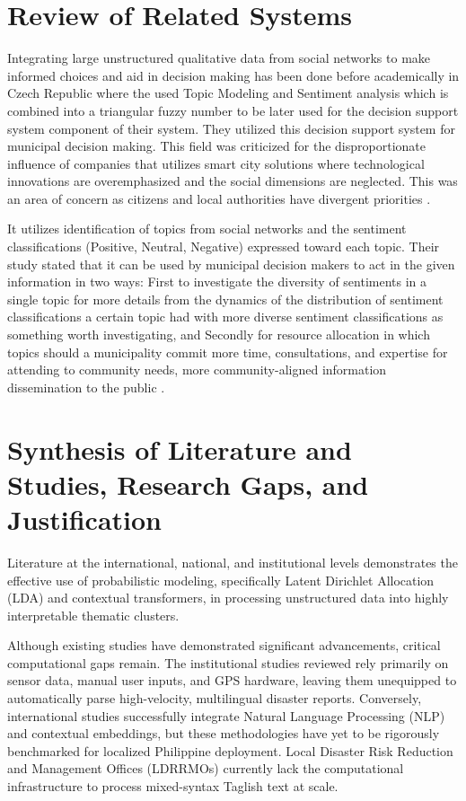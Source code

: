 \section*{Review of Related Systems}
Integrating large unstructured qualitative data from social networks to make informed choices and aid in decision making has been done before academically in Czech Republic where the used Topic Modeling and Sentiment analysis which is combined into a triangular fuzzy number to be later used for the decision support system component of their system. They utilized this decision support system for municipal decision making. This field was criticized for the disproportionate influence of companies that utilizes smart city solutions where technological innovations are overemphasized and the social dimensions are neglected. This was an area of concern as citizens and local authorities have divergent priorities \parencite{svana2026improving}.

It utilizes identification of topics from social networks and the sentiment classifications (Positive, Neutral, Negative) expressed toward each topic. Their
study stated that it can be used by municipal decision makers to act in the given information in two ways: First to investigate the diversity of sentiments in a single topic for more details from the dynamics of the distribution of sentiment classifications a certain topic had with more diverse sentiment classifications as something worth investigating, and Secondly for resource allocation in which topics should a municipality commit more time, consultations, and expertise for attending to community needs, more community-aligned information dissemination to the public \parencite{svana2026improving}.



\section*{Synthesis of Literature and Studies, Research Gaps, and Justification}

Literature at the international, national, and institutional levels
demonstrates the effective use of probabilistic modeling, specifically Latent
Dirichlet Allocation (LDA) and contextual transformers, in processing
unstructured data into highly interpretable thematic clusters.

Although existing studies have demonstrated significant advancements, critical
computational gaps remain. The institutional studies reviewed rely primarily on
sensor data, manual user inputs, and GPS hardware, leaving them unequipped to
automatically parse high-velocity, multilingual disaster reports. Conversely,
international studies successfully integrate Natural Language Processing (NLP)
and contextual embeddings, but these methodologies have yet to be rigorously
benchmarked for localized Philippine deployment. Local Disaster Risk Reduction
and Management Offices (LDRRMOs) currently lack the computational
infrastructure to process mixed-syntax Taglish text at scale.

